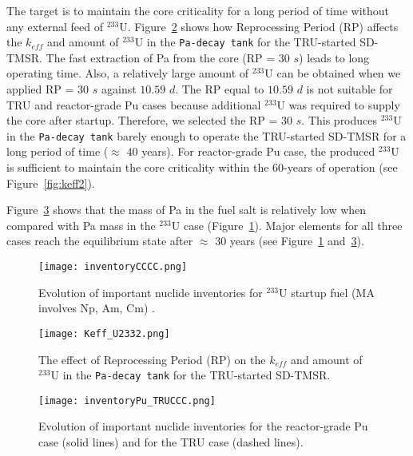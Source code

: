 The target is to maintain the core criticality for a long period of time without any external feed of $^{233}$U. Figure~\ref{fig:Keff_U2332} shows how Reprocessing Period (RP) affects the $k_{eff}$ and amount of $^{233}$U in the \texttt{Pa-decay tank} for the TRU-started SD-TMSR. The fast extraction of Pa from the core (RP = $30$ $s$) leads to long operating time. Also, a relatively large amount of $^{233}$U can be obtained when we applied RP = $30$ $s$ against $10.59$ $d$. The RP equal to $10.59$ $d$ is not suitable for TRU and reactor-grade Pu cases because additional $^{233}$U was required to supply the core after startup. Therefore, we selected the RP = $30$ $s$. This produces $^{233}$U in the \texttt{Pa-decay tank} barely enough to operate the TRU-started SD-TMSR for a long period of time ($\approx$ $40$ years). For reactor-grade Pu case, the produced $^{233}$U is sufficient to maintain the core criticality within the 60-years of operation (see Figure~\ref{fig:keff2}).

Figure~\ref{fig:inventoryPu_TRUCCC} shows that the mass of Pa in the fuel salt 
is relatively low when compared with Pa mass in the $^{233}$U case (Figure~\ref{fig:inventoryCCCC}). Major 
elements for all three cases reach the equilibrium state after $\approx$ $30$ 
years (see Figure~\ref{fig:inventoryCCCC} and~\ref{fig:inventoryPu_TRUCCC}).

\begin{figure}
	\centering
	\texttt{[image: inventoryCCCC.png]}
	\vspace{-0.4in}
	\caption{Evolution of important nuclide inventories for $^{233}$U 
		startup fuel (MA involves Np, Am, Cm) \cite{ashraf2019whole_core}.}
	\label{fig:inventoryCCCC}
\end{figure}

\begin{figure}
	\centering
	\texttt{[image: Keff\_U2332.png]}
	\vspace{-0.5in}
	\caption{The effect of Reprocessing Period (RP) on the $k_{eff}$ and amount of $^{233}$U in the \texttt{Pa-decay tank} for the TRU-started SD-TMSR.}
	\label{fig:Keff_U2332}
\end{figure}

\begin{figure}
	\centering
	\texttt{[image: inventoryPu\_TRUCCC.png]}
	\vspace{-0.5in}
	\caption{Evolution of important nuclide inventories for the 
		reactor-grade Pu case (solid lines) and for the TRU case (dashed lines).}
	\label{fig:inventoryPu_TRUCCC}
\end{figure}

